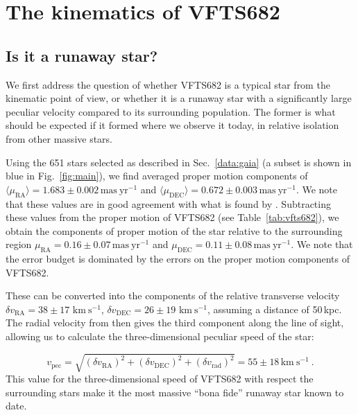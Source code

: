 \documentclass[apjl,twocolumn]{emulateapj}
\newcommand{\kms}{{\,\mathrm{km\ s^{-1}}}}
\DeclareRobustCommand{\Figref}[1]{Fig.~\ref{#1}}
\DeclareRobustCommand{\Tabref}[1]{Table~\ref{#1}}
\DeclareRobustCommand{\Secref}[1]{Sec.~\ref{#1}}
\begin{document}
\section{The kinematics of VFTS682}
\label{sec:results}

\subsection{Is it a runaway star?}
\label{sec:runaway}
We first address the question of whether VFTS682 is a typical star
from the kinematic point of view, or whether it is a runaway star with
a significantly large peculiar velocity compared to its surrounding population. The former is what should
be expected if it formed where we observe it today, in relative
isolation from other massive stars.

Using the 651 stars selected as described in \Secref{data:gaia} (a
subset is shown in blue in \Figref{fig:main}), we find averaged proper motion components of
$\langle\mu_\mathrm{RA}\rangle = 1.683\pm0.002\,\mathrm{mas\ yr^{-1}}$ and
$\langle\mu_\mathrm{DEC}\rangle =
0.672\pm0.003\,\mathrm{mas\ yr^{-1}}$. We note that these values are
in good agreement with what is found by \cite{lennon:18}. Subtracting these values from the
proper motion of VFTS682 (see \Tabref{tab:vfts682}), we obtain the
components of proper motion of the star relative to the surrounding region
$\mu_\mathrm{RA} = 0.16\pm 0.07\,\mathrm{mas\ yr^{-1}}$ and $\mu_\mathrm{DEC} =
0.11\pm 0.08\,\mathrm{mas\ yr^{-1}}$. We note that the error budget is
dominated by the errors on the proper motion components of VFTS682.

These can be converted into
the components of the relative transverse velocity $\delta v_\mathrm{RA}=38\pm17\,\kms$,
$\delta v_\mathrm{DEC}=26\pm19\,\kms$, assuming a distance of
50\,kpc. %
The radial velocity from
\cite{bestenlehner:11} then gives the third component along
the line of sight, allowing us to calculate the three-dimensional
peculiar speed of the star:

\begin{equation}
  \label{eq:speed_around}
  v_\mathrm{pec} = \sqrt{\left(\delta v_\mathrm{RA}\right)^2
    +\left(\delta v_\mathrm{DEC}\right)^2+\left(\delta
      v_\mathrm{rad}\right)^2} = 55 \pm 18 
  \kms \ .
\end{equation}
This value for the three-dimensional speed of VFTS682 with respect the
surrounding stars make it the most massive ``bona fide'' runaway star
known to date.
\end{document}
